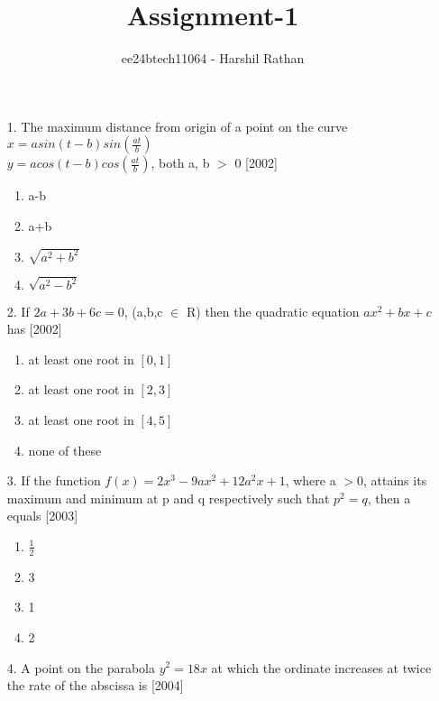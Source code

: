 \documentclass[journal,12pt,twocolumn]{IEEEtran}
\theoremstyle{remark}
\begin{document}

\vspace{3cm}

\title{Assignment-1}
\author{ee24btech11064 - Harshil Rathan}
\maketitle
\newpage
\bigskip

\renewcommand{\thefigure}{\theenumi}
\renewcommand{\thetable}{\theenumi}
\begin{enumerate}
\item[1.]The maximum distance from origin of a point on the curve\\ $x = a sin(t-b) sin(\frac{at}{b})$\\ $y = a cos(t-b) cos(\frac{at}{b})$, both a, b $>$ 0 \hfill{[2002]}
\begin{enumerate}
    \item a-b
        \item a+b
	    \item $\sqrt{a^2+b^2}$
	        \item $\sqrt{a^2-b^2}$  \\
		\end{enumerate}
		\item[2.]If $2a+3b+6c=0$, (a,b,c $\in$ R) then the quadratic equation $ax^2+bx+c$ has \hfill{[2002]}
		\begin{enumerate}
		    \item at least one root in $[0,1]$
		        \item at  least one root in $[2,3]$
			    \item at least one root in $[4,5]$
			        \item none of these \\
				\end{enumerate}
				\item[3.]If the function $f(x)=2x^3-9ax^2+12a^2x+1$, where a $>$0, attains its maximum and minimum at p and q respectively such that $p
				    ^2=q$, then a equals  \hfill{[2003]}
				    \begin{enumerate}
				           \item $\frac{1}{2}$
					          \item 3
						         \item 1
							        \item 2
								\end{enumerate}
								\item[4.]A point on the parabola $y^2=18x$ at which the ordinate increases at twice the rate of the abscissa is \hfill{[2004]}

\end{enumerate}
\end{document}
